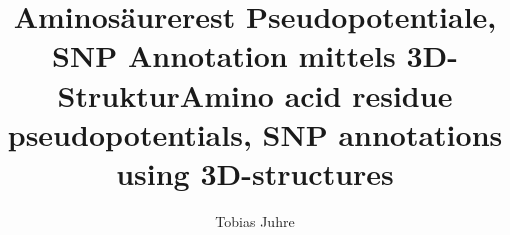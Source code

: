 \documentclass[master,german]{hgbthesis}
\begin{document}

\title{Aminosäurerest Pseudopotentiale, SNP Annotation mittels 3D-Struktur\texorpdfstring{\newline \newline }{}Amino acid residue pseudopotentials, SNP annotations using 3D-structures}
\author{Tobias Juhre}

\gegenstand{}


\frontmatter
\maketitle
\tableofcontents






\mainmatter         %










\appendix


\printbibliography  %


\end{document}
